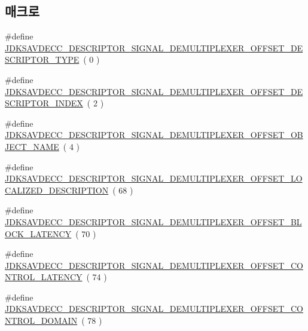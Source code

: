 \subsection*{매크로}
\begin{DoxyCompactItemize}
\item 
\#define \hyperlink{group__descriptor__signal__demultiplexer_gaf7ec77554dd9c760fafb241cbf4bc364}{J\+D\+K\+S\+A\+V\+D\+E\+C\+C\+\_\+\+D\+E\+S\+C\+R\+I\+P\+T\+O\+R\+\_\+\+S\+I\+G\+N\+A\+L\+\_\+\+D\+E\+M\+U\+L\+T\+I\+P\+L\+E\+X\+E\+R\+\_\+\+O\+F\+F\+S\+E\+T\+\_\+\+D\+E\+S\+C\+R\+I\+P\+T\+O\+R\+\_\+\+T\+Y\+PE}~( 0 )
\item 
\#define \hyperlink{group__descriptor__signal__demultiplexer_ga4c17b92085473b39da402eb6f4ac5a28}{J\+D\+K\+S\+A\+V\+D\+E\+C\+C\+\_\+\+D\+E\+S\+C\+R\+I\+P\+T\+O\+R\+\_\+\+S\+I\+G\+N\+A\+L\+\_\+\+D\+E\+M\+U\+L\+T\+I\+P\+L\+E\+X\+E\+R\+\_\+\+O\+F\+F\+S\+E\+T\+\_\+\+D\+E\+S\+C\+R\+I\+P\+T\+O\+R\+\_\+\+I\+N\+D\+EX}~( 2 )
\item 
\#define \hyperlink{group__descriptor__signal__demultiplexer_ga3d2fba5abe4f1396ba6f22b429f4e6c1}{J\+D\+K\+S\+A\+V\+D\+E\+C\+C\+\_\+\+D\+E\+S\+C\+R\+I\+P\+T\+O\+R\+\_\+\+S\+I\+G\+N\+A\+L\+\_\+\+D\+E\+M\+U\+L\+T\+I\+P\+L\+E\+X\+E\+R\+\_\+\+O\+F\+F\+S\+E\+T\+\_\+\+O\+B\+J\+E\+C\+T\+\_\+\+N\+A\+ME}~( 4 )
\item 
\#define \hyperlink{group__descriptor__signal__demultiplexer_gaa72edbfb3a3ccd2dfbe47d30059c63e5}{J\+D\+K\+S\+A\+V\+D\+E\+C\+C\+\_\+\+D\+E\+S\+C\+R\+I\+P\+T\+O\+R\+\_\+\+S\+I\+G\+N\+A\+L\+\_\+\+D\+E\+M\+U\+L\+T\+I\+P\+L\+E\+X\+E\+R\+\_\+\+O\+F\+F\+S\+E\+T\+\_\+\+L\+O\+C\+A\+L\+I\+Z\+E\+D\+\_\+\+D\+E\+S\+C\+R\+I\+P\+T\+I\+ON}~( 68 )
\item 
\#define \hyperlink{group__descriptor__signal__demultiplexer_ga9f2cde7eddd546437b2d7523a68a5490}{J\+D\+K\+S\+A\+V\+D\+E\+C\+C\+\_\+\+D\+E\+S\+C\+R\+I\+P\+T\+O\+R\+\_\+\+S\+I\+G\+N\+A\+L\+\_\+\+D\+E\+M\+U\+L\+T\+I\+P\+L\+E\+X\+E\+R\+\_\+\+O\+F\+F\+S\+E\+T\+\_\+\+B\+L\+O\+C\+K\+\_\+\+L\+A\+T\+E\+N\+CY}~( 70 )
\item 
\#define \hyperlink{group__descriptor__signal__demultiplexer_ga3373fa02e1468d7cf3192013ce5f44ac}{J\+D\+K\+S\+A\+V\+D\+E\+C\+C\+\_\+\+D\+E\+S\+C\+R\+I\+P\+T\+O\+R\+\_\+\+S\+I\+G\+N\+A\+L\+\_\+\+D\+E\+M\+U\+L\+T\+I\+P\+L\+E\+X\+E\+R\+\_\+\+O\+F\+F\+S\+E\+T\+\_\+\+C\+O\+N\+T\+R\+O\+L\+\_\+\+L\+A\+T\+E\+N\+CY}~( 74 )
\item 
\#define \hyperlink{group__descriptor__signal__demultiplexer_gac274839eefa87e6cad4c49d3d6f821fa}{J\+D\+K\+S\+A\+V\+D\+E\+C\+C\+\_\+\+D\+E\+S\+C\+R\+I\+P\+T\+O\+R\+\_\+\+S\+I\+G\+N\+A\+L\+\_\+\+D\+E\+M\+U\+L\+T\+I\+P\+L\+E\+X\+E\+R\+\_\+\+O\+F\+F\+S\+E\+T\+\_\+\+C\+O\+N\+T\+R\+O\+L\+\_\+\+D\+O\+M\+A\+IN}~( 78 )

\end{DoxyCompactItemize}
